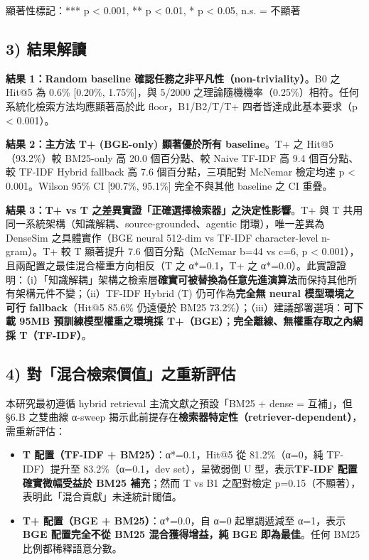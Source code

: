 顯著性標記：*** p < 0.001, ** p < 0.01, * p < 0.05, n.s. = 不顯著

\subsection{3) 結果解讀}\label{ux7d50ux679cux89e3ux8b80}

\textbf{結果 1：Random baseline 確認任務之非平凡性（non-triviality）}。B0
之 Hit@5 為 0.6\% {[}0.20\%, 1.75\%{]}，與 5/2000 之理論隨機機率（0.25\%）相符。任何系統化檢索方法均應顯著高於此
floor，B1/B2/T/T+ 四者皆達成此基本要求（p < 0.001）。

\textbf{結果 2：主方法 T+ (BGE-only) 顯著優於所有 baseline}。T+ 之
Hit@5（93.2\%）較 BM25-only 高 20.0 個百分點、較 Naive TF-IDF
高 9.4 個百分點、較 TF-IDF Hybrid fallback 高 7.6 個百分點，三項配對 McNemar
檢定均達 p < 0.001。Wilson 95\% CI {[}90.7\%, 95.1\%{]} 完全不與其他
baseline 之 CI 重疊。

\textbf{結果 3：T+ vs T 之差異實證「正確選擇檢索器」之決定性影響}。T+ 與
T 共用同一系統架構（知識解耦、source-grounded、agentic 閉環），唯一差異為 DenseSim
之具體實作（BGE neural 512-dim vs TF-IDF character-level n-gram）。T+ 較 T
顯著提升 7.6 個百分點（McNemar b=44 vs c=6, p < 0.001），且兩配置之最佳混合權重方向相反（T
之 α*=0.1，T+ 之 α*=0.0）。此實證證明：（i）「知識解耦」架構之檢索層\textbf{確實可被替換為任意先進演算法}而保持其他所有架構元件不變；（ii）TF-IDF
Hybrid (T) 仍可作為\textbf{完全無 neural 模型環境之可行 fallback}（Hit@5
85.6\% 仍遠優於 BM25 73.2\%）；（iii）建議部署選項：\textbf{可下載 95MB
預訓練模型權重之環境採 T+（BGE）}；\textbf{完全離線、無權重存取之內網採 T（TF-IDF）}。

\subsection{4) 對「混合檢索價值」之重新評估}\label{ux6df7ux5408ux6aa2ux7d22ux50f9ux503cux91cdux65b0ux5b9aux4f4d}

本研究最初遵循 hybrid retrieval 主流文獻之預設「BM25 + dense = 互補」，但 §6.B 之雙曲線
α-sweep 揭示此前提存在\textbf{檢索器特定性（retriever-dependent）}，需重新評估：

\begin{itemize}
\tightlist
\item
  \textbf{T 配置（TF-IDF + BM25）}：α*=0.1，Hit@5 從 81.2\%（α=0，純 TF-IDF）提升至
  83.2\%（α=0.1，dev set），呈微弱倒 U 型，表示\textbf{TF-IDF 配置確實微幅受益於
  BM25 補充}；然而 T vs B1 之配對檢定 p=0.15（不顯著），表明此「混合貢獻」未達統計閾值。
\item
  \textbf{T+ 配置（BGE + BM25）}：α*=0.0，自 α=0 起單調遞減至 α=1，表示\textbf{BGE
  配置完全不從 BM25 混合獲得增益，純 BGE 即為最佳}。任何 BM25 比例都稀釋語意分數。
\end{itemize}

